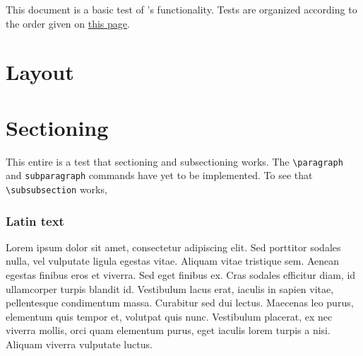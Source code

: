 \documentclass[11pt]{article}
\begin{document}
\tableofcontents
This document is a basic test of \DiscoTeX{}'s functionality.
Tests are organized according to the order given on \href{ftp://ftp.tex.ac.uk/tex-archive/info/latex2e-help-texinfo/latex2e.html}{this page}.
\section{}%
\section{}%
\section{}%
\section{}%
\section{}%
\section{Layout} %
\section{Sectioning}
This entire  is a test that sectioning and subsectioning works.
The \verb|\paragraph| and \verb|subparagraph| commands have yet to be implemented.
To see that \verb|\subsubsection| works,

\subsubsection{Latin text}
Lorem ipsum dolor sit amet, consectetur adipiscing elit. Sed porttitor sodales nulla, vel vulputate ligula egestas vitae. Aliquam vitae tristique sem. Aenean egestas finibus eros et viverra. Sed eget finibus ex. Cras sodales efficitur diam, id ullamcorper turpis blandit id. Vestibulum lacus erat, iaculis in sapien vitae, pellentesque condimentum massa. Curabitur sed dui lectus. Maecenas leo purus, elementum quis tempor et, volutpat quis nunc. Vestibulum placerat, ex nec viverra mollis, orci quam elementum purus, eget iaculis lorem turpis a nisi. Aliquam viverra vulputate luctus.
\end{document}
